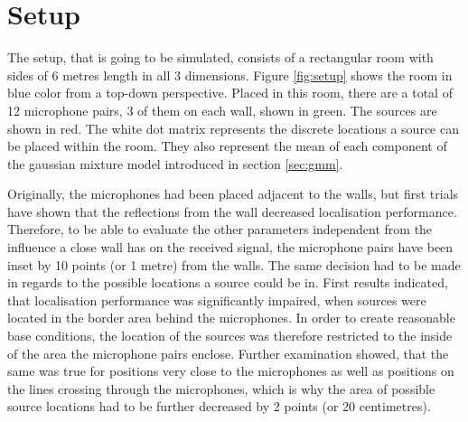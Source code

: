 \section{Setup}
\label{sec:setup}

%	

The setup, that is going to be simulated, consists of a rectangular room with sides of 6 metres length in all 3 dimensions. Figure \ref{fig:setup} shows the room in blue color from a top-down perspective. Placed in this room, there are a total of 12 microphone pairs, 3 of them on each wall, shown in green. The sources are shown in red. The white dot matrix represents the discrete locations a source can be placed within the room. They also represent the mean of each component of the gaussian mixture model introduced in section \ref{sec:gmm}.

Originally, the microphones had been placed adjacent to the walls, but first trials have shown that the reflections from the wall decreased localisation performance. Therefore, to be able to evaluate the other parameters independent from the influence a close wall has on the received signal, the microphone pairs have been inset by 10 points (or 1 metre) from the walls. The same decision had to be made in regards to the possible locations a source could be in. First results indicated, that localisation performance was significantly impaired, when sources were located in the border area behind the microphones. In order to create reasonable base conditions, the location of the sources was therefore restricted to the inside of the area the microphone pairs enclose. Further examination showed, that the same was true for positions very close to the microphones as well as positions on the lines crossing through the microphones, which is why the area of possible source locations had to be further decreased by 2 points (or 20 centimetres).

